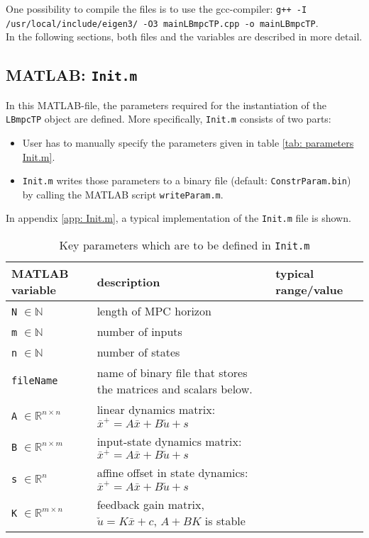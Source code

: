 \documentclass[letter]{article}
\begin{document}
\begin{sffamily}
\noindent
One possibility to compile the files is to use the gcc-compiler: \newline
\texttt{g++ -I /usr/local/include/eigen3/ -O3 mainLBmpcTP.cpp -o mainLBmpcTP}. \\


\noindent
In the following sections, both files and the variables are described in more detail.
\subsection{MATLAB: \texttt{Init.m}}
In this MATLAB-file, the parameters required for the instantiation of the \texttt{LBmpcTP} object are defined. More specifically, \texttt{Init.m} consists of two parts:
\begin{itemize}
	\item User has to manually specify the parameters given in table \ref{tab: parameters Init.m}.
	\item \texttt{Init.m} writes those parameters to a binary file (default: \texttt{ConstrParam.bin}) by calling the MATLAB script \texttt{writeParam.m}.
\end{itemize}
In appendix \ref{app: Init.m}, a typical implementation of the \texttt{Init.m} file is shown. \\

\begin{table}[!htdp]
\caption{Key parameters which are to be defined in \texttt{Init.m}}
\begin{center}
\begin{tabular}{|l|l|l|}\hline
{\bf MATLAB variable} & description & typical range/value \\ \hline\hline

 \texttt{N} $\in\mathbb{N}$ & length of MPC horizon & \\ \hline
 \texttt{m} $\in\mathbb{N}$ & number of inputs & \\ \hline
 \texttt{n} $\in\mathbb{N}$ & number of states & \\ \hline \hline
 
 \texttt{fileName} & name of binary file that stores the matrices and scalars below. & \\ \hline \hline
 
 \texttt{A} $\in\mathbb{R}^{n\times n}$ & linear dynamics matrix: $\bar{x}^+ = A\bar{x}+B\check{u}+s$ & \\ \hline
 \texttt{B} $\in\mathbb{R}^{n\times m}$ & input-state dynamics matrix: $\bar{x}^+ = A\bar{x}+B\check{u}+s$ & \\ \hline
 \texttt{s} $\in\mathbb{R}^{n}$ & affine offset in state dynamics:  $\bar{x}^+ = A\bar{x}+B\check{u}+s$ & \\ \hline
 \texttt{K} $\in\mathbb{R}^{m\times n}$  & feedback gain matrix, $\check{u}=K\bar{x}+c$, $A+BK$ is stable & \\ \hline \hline
  

\end{tabular}
\end{center}
\end{table}
\end{sffamily}
\end{document}
